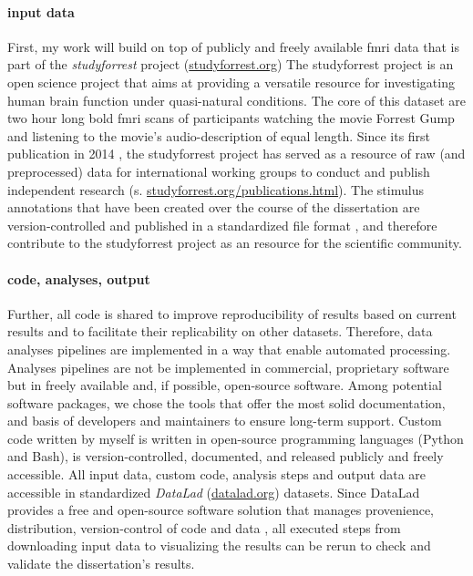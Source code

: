 \paragraph{input data}

First, my work will build on top of publicly and freely available \ac{fmri} data that
is part of the \textit{studyforrest} project
(\href{www.studyforrest.org}{studyforrest.org})
%
The studyforrest project is an open science project that aims at providing a
versatile resource for investigating human brain function under quasi-natural
conditions.
%
The core of this dataset are two hour long \ac{bold} \ac{fmri} scans of
participants watching the movie Forrest Gump and listening to the movie's
audio-description of equal length.
%
Since its first publication in 2014 \citep{hanke2014audiomovie}, the
studyforrest project has served as a resource of raw (and preprocessed) data for
international working groups to conduct and publish independent research (s.
\href{www.studyforrest.org/publications.html}{studyforrest.org/publications.html}).
%
The stimulus annotations that have been created over the course of the
dissertation are version-controlled and published in a standardized file format
\citep{haeusler2021speechanno}, and therefore contribute to the studyforrest
project as an resource for the scientific community.


\paragraph{code, analyses, output}

Further, all code is shared to improve reproducibility of results based on
current results and to facilitate their replicability on other datasets.
Therefore, data analyses pipelines are implemented in a way that enable
automated processing.
%
Analyses pipelines are not be implemented in commercial, proprietary software
but in freely available and, if possible, open-source software.
Among potential software packages, we chose the tools that offer the most solid
documentation, and basis of developers and maintainers to ensure long-term
support.
Custom code written by myself is written in open-source programming languages
(Python and Bash), is version-controlled, documented, and released publicly and
freely accessible.
%
All input data, custom code, analysis steps and output data are accessible in
standardized \textit{DataLad} (\href{www.datalad.org}{datalad.org}) datasets.
Since DataLad provides a free and open-source software solution that manages
provenience, distribution, version-control of code and data
\citep{halchenko2021datalad}, all executed steps from downloading input data to
visualizing the results can be rerun to check and validate the dissertation's
results.


